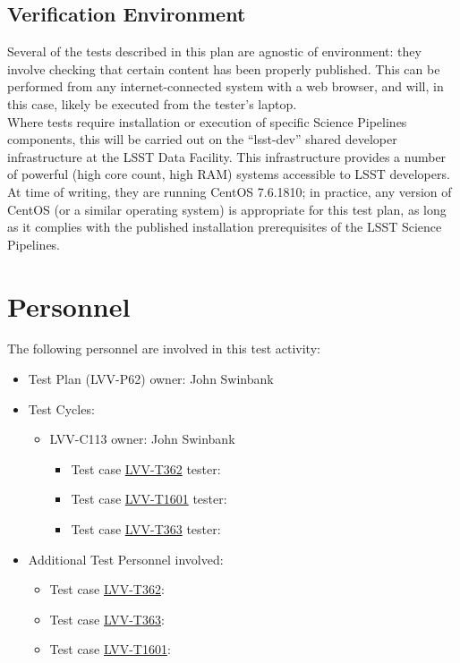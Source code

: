 \documentclass[DM,lsstdraft,STR,toc]{lsstdoc}
\begin{document}
\subsection{Verification Environment}
\label{sect:hwconf}
  Several of the tests described in this plan are agnostic of environment:
they involve checking that certain content has been properly published.
This can be performed from any internet-connected system with a web
browser, and will, in this case, likely be executed from the tester's
laptop.\\[2\baselineskip]Where tests require installation or execution
of specific Science Pipelines components, this will be carried out on
the ``lsst-dev'' shared developer infrastructure at the LSST Data
Facility. This infrastructure provides a number of powerful (high core
count, high RAM) systems accessible to LSST developers. At time of
writing, they are running CentOS 7.6.1810; in practice, any version of
CentOS (or a similar operating system) is appropriate for this test
plan, as long as it complies with the published installation
prerequisites of the LSST Science Pipelines.\\[2\baselineskip]





\newpage
\section{Personnel}
\label{sect:personnel}

The following personnel are involved in this test activity:

\begin{itemize}
\item Test Plan (LVV-P62) owner: John Swinbank
\item Test Cycles:
\begin{itemize}
  \item LVV-C113 owner: 
    John Swinbank
  \begin{itemize}
    \item Test case \href{https://jira.lsstcorp.org/secure/Tests.jspa#/testCase/LVV-T362}{LVV-T362} tester: 
    \item Test case \href{https://jira.lsstcorp.org/secure/Tests.jspa#/testCase/LVV-T1601}{LVV-T1601} tester: 
    \item Test case \href{https://jira.lsstcorp.org/secure/Tests.jspa#/testCase/LVV-T363}{LVV-T363} tester: 
  \end{itemize}
\end{itemize}
\item Additional Test Personnel involved:
  \begin{itemize}
    \item Test case \href{https://jira.lsstcorp.org/secure/Tests.jspa#/testCase/LVV-T362}{LVV-T362}: 
    \item Test case \href{https://jira.lsstcorp.org/secure/Tests.jspa#/testCase/LVV-T363}{LVV-T363}: 
    \item Test case \href{https://jira.lsstcorp.org/secure/Tests.jspa#/testCase/LVV-T1601}{LVV-T1601}: 
  \end{itemize}
\end{itemize}
\end{document}
